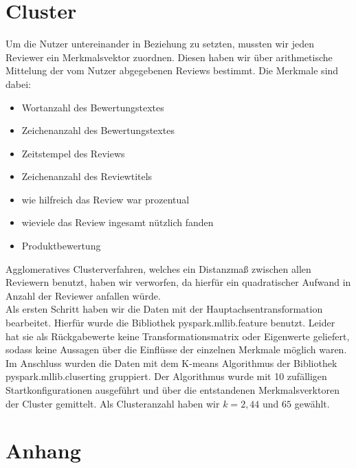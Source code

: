 \documentclass{scrartcl}
\theoremstyle{my_th_style}
\begin{document}
\section{Cluster}
Um die Nutzer untereinander in Beziehung zu setzten, mussten wir jeden Reviewer ein Merkmalsvektor zuordnen. Diesen haben wir über arithmetische Mittelung der vom Nutzer abgegebenen Reviews bestimmt. Die Merkmale sind dabei:
\begin{itemize}
\item Wortanzahl des Bewertungstextes
\item Zeichenanzahl des Bewertungstextes
\item Zeitstempel des Reviews
\item Zeichenanzahl des Reviewtitels
\item wie hilfreich das Review war prozentual
\item wieviele das Review ingesamt nützlich fanden
\item Produktbewertung
\end{itemize}

Agglomeratives Clusterverfahren, welches ein Distanzmaß zwischen allen Reviewern benutzt, haben wir verworfen, da hierfür ein quadratischer Aufwand in Anzahl der Reviewer anfallen würde.\\
Als ersten Schritt haben wir die Daten mit der Hauptachsentransformation bearbeitet. Hierfür wurde die Bibliothek pyspark.mllib.feature benutzt. Leider hat sie als Rückgabewerte keine Transformationsmatrix oder Eigenwerte geliefert, sodass keine Aussagen über die Einflüsse der einzelnen Merkmale möglich waren. Im Anschluss wurden die Daten mit dem K-means Algorithmus der Bibliothek pyspark.mllib.cluserting gruppiert. Der Algorithmus wurde mit 10 zufälligen Startkonfigurationen ausgeführt und über die entstandenen Merkmalsverktoren der Cluster gemittelt. Als Clusteranzahl haben wir $k=2,44$ und $65$ gewählt.

\newpage
\section*{Anhang}
\end{document}
